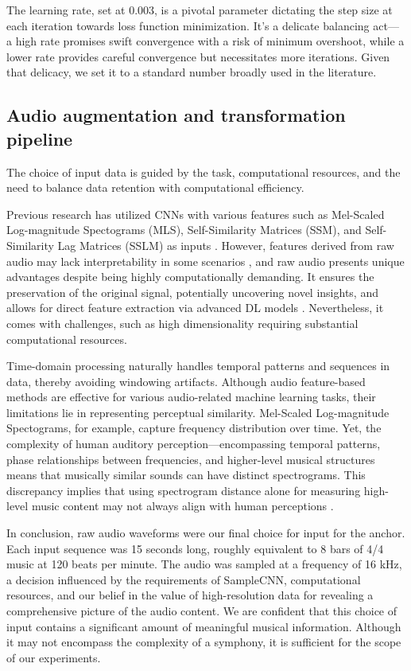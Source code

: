 The learning rate, set at 0.003, is a pivotal parameter dictating the step size at each iteration towards loss function minimization. It's a delicate balancing act— a high rate promises swift convergence with a risk of minimum overshoot, while a lower rate provides careful convergence but necessitates more iterations. Given that delicacy, we set it to a standard number broadly used in the literature.

\subsection{Audio augmentation and transformation pipeline}

The choice of input data is guided by the task, computational resources, and the need to balance data retention with computational efficiency.

Previous research has utilized CNNs with various features such as Mel-Scaled Log-magnitude Spectograms (MLS), Self-Similarity Matrices (SSM), and Self-Similarity Lag Matrices (SSLM) as inputs \cite{Hernandez-Olivan2021MusicFeatures}. However, features derived from raw audio may lack interpretability in some scenarios \cite{Schindler2020DeepTutorial}, and raw audio presents unique advantages despite being highly computationally demanding. It ensures the preservation of the original signal, potentially uncovering novel insights, and allows for direct feature extraction via advanced DL models \cite{learning, verydeep}. Nevertheless, it comes with challenges, such as high dimensionality requiring substantial computational resources. 

Time-domain processing naturally handles temporal patterns and sequences in data, thereby avoiding windowing artifacts. Although audio feature-based methods are effective for various audio-related machine learning tasks, their limitations lie in representing perceptual similarity. Mel-Scaled Log-magnitude Spectograms, for example, capture frequency distribution over time. Yet, the complexity of human auditory perception—encompassing temporal patterns, phase relationships between frequencies, and higher-level musical structures means that musically similar sounds can have distinct spectrograms. This discrepancy implies that using spectrogram distance alone for measuring high-level music content may not always align with human perceptions \cite{Kim2020OneStrategies, Mesostructures2023}.

In conclusion, raw audio waveforms were our final choice for input for the anchor. Each input sequence was 15 seconds long, roughly equivalent to 8 bars of 4/4 music at 120 beats per minute. The audio was sampled at a frequency of 16 kHz, a decision influenced by the requirements of SampleCNN, computational resources, and our belief in the value of high-resolution data for revealing a comprehensive picture of the audio content. We are confident that this choice of input contains a significant amount of meaningful musical information. Although it may not encompass the complexity of a symphony, it is sufficient for the scope of our experiments.


